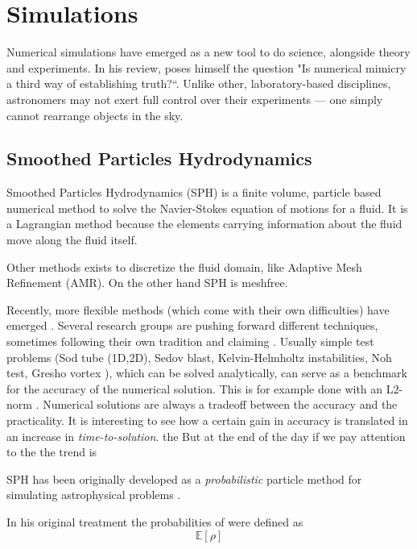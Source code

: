 \chapter{Simulations}
\label{ch:simulations}

Numerical simulations have emerged as a new tool to do science, alongside theory and experiments.
In his review, \cite{Heng2014} poses himself the question "Is numerical mimicry a third way of establishing truth?``. Unlike other, laboratory-based disciplines, astronomers may not exert full control over their experiments — one simply cannot rearrange objects in the sky.




\section{Smoothed Particles Hydrodynamics}
Smoothed Particles Hydrodynamics (SPH) is a finite volume, particle based numerical method to solve the Navier-Stokes equation of motions for a fluid.
It is a Lagrangian method because the elements carrying information about the fluid move along the fluid itself.

Other methods exists to discretize the fluid domain, like Adaptive Mesh Refinement (AMR).
On the other hand SPH is meshfree.

Recently, more flexible methods (which come with their own difficulties) have emerged \citep{Springel2010, Shadowfax, Arepo}.
Several research groups are pushing forward different techniques, sometimes following their own tradition and claiming . 
Usually simple test problems (Sod tube (1D,2D), Sedov blast, Kelvin-Helmholtz instabilities, Noh test, Gresho vortex \citet{Gresho1990}), %
which can be solved analytically, can serve as a benchmark for the accuracy of the numerical solution. This is for example done with an L2-norm \citep{Borrow}.
Numerical solutions are always a tradeoff between the accuracy and the practicality.
It is interesting to see how a certain gain in accuracy is translated in an increase in \emph{time-to-solution}. the But at the end of the day if we pay attention to the the trend is 

SPH has been originally developed as a \emph{probabilistic} particle method for simulating astrophysical problems \citep{Lucy1977, Gingold1977}.

In his original treatment \citet{Gingold1977} the probabilities of were defined as 
\begin{equation}
 \mathbb{E}[\rho] %
\end{equation}





